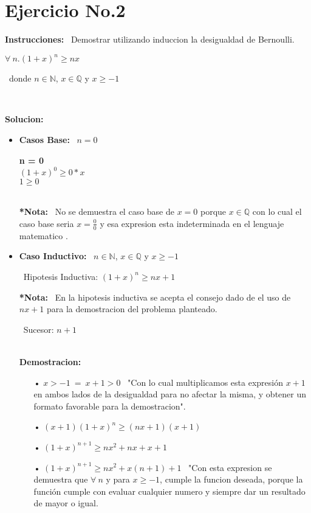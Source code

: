 \documentclass[10pt,a4paper]{article}
\begin{document}
\section*{Ejercicio No.2}

\begin{large}
\textbf{Instrucciones:} \ {Demostrar utilizando induccion la desigualdad de Bernoulli.}
\end{large}

\begin{center}
$ \forall\ n.(1+x)^n \geq nx $
\end{center}
\
donde $n\in \mathbb{N}$, $x\in \mathbb{Q}$ y $x\geq -1$

\
\\\begin{large}
\textbf{Solucion: }
\end{large}

\begin{itemize}
\item \textbf{Casos Base:} \ $ n=0 $ \  
\begin{center}
\textbf{n = 0}
\
\\$ (1+x)^0 \geq 0*x $
\
\\$ 1 \geq 0 $


\
\\\textbf{*Nota:} \ No se demuestra el caso base de $ x = 0 $ porque $ x\in \mathbb{Q}$  con lo cual el caso base seria $ x = \frac{0}{0}$ y esa expresion esta indeterminada en el lenguaje matematico .
\end{center}

\item \textbf{Caso Inductivo:} \ $n\in \mathbb{N}$, $ x\in \mathbb{Q}$ y $x\geq -1$

\ Hipotesis Inductiva: $ (1+x)^n \geq nx + 1 $

\textbf{*Nota:} \ En la hipotesis inductiva se acepta el consejo dado de el uso de $ nx + 1 $ para la demostracion del problema planteado.

\ Sucesor: $ n+1 $

\
\\\textbf{Demostracion:}
\begin{itemize}
\item[•] $ x > -1 \ = \ x+1 > 0  $  \ "Con lo cual multiplicamos esta expresión $ x + 1$ en ambos lados de la desigualdad para no afectar la misma, y obtener un formato favorable para la demostracion". 
\item[•] $ (x+1)(1+x)^n \geq (nx + 1)(x+1) $
\item[•]$ (1+x)^{n+1} \geq nx^2 + nx + x + 1 $
\item[•] $ (1+x)^{n+1} \geq nx^2 + x(n+1) + 1 $ \ "Con esta expresion se demuestra que $ \forall\ n $ y para $ x\geq -1 $, cumple la funcion deseada, porque la función cumple con evaluar cualquier numero y siempre dar un resultado de mayor o igual.  
\end{itemize}

\
\\ 
\end{itemize}
\end{document}
